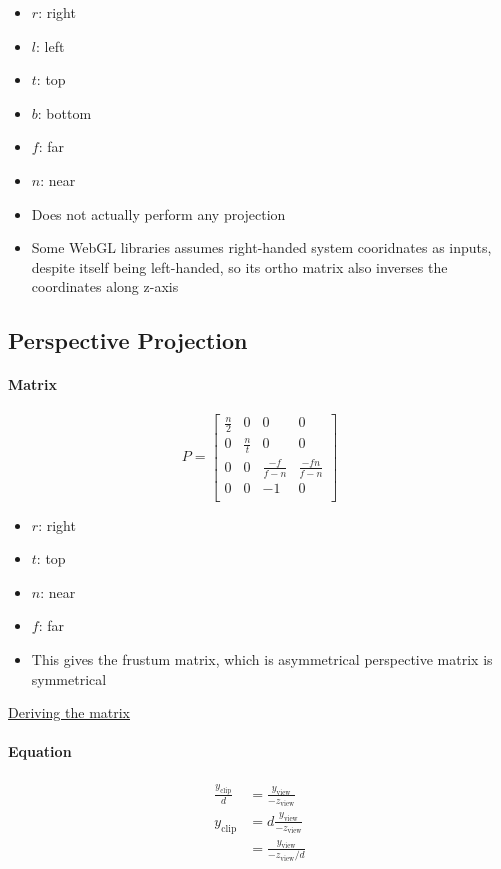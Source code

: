     \begin{itemize}
      \item $ r $: right
      \item $ l $: left
      \item $ t $: top
      \item $ b $: bottom
      \item $ f $: far
      \item $ n $: near
      \item Does not actually perform any projection
      \item Some WebGL libraries assumes right-handed system cooridnates as
      inputs, despite itself being left-handed, so its ortho matrix also
      inverses the coordinates along z-axis
    \end{itemize}

  \subsection{Perspective Projection}

    \paragraph{Matrix}
    \begin{equation}
      P =
      \begin{bmatrix}
        \frac{n}{2} & 0 & 0 & 0 \\
        0 & \frac{n}{t} & 0 & 0 \\
        0 & 0 & \frac{-f}{f - n} & \frac{-fn}{f - n} \\
        0 & 0 & -1 & 0 \\
      \end{bmatrix}
    \end{equation}

    \begin{itemize}
      \item $ r $: right
      \item $ t $: top
      \item $ n $: near
      \item $ f $: far
      \item This gives the frustum matrix, which is asymmetrical
      perspective matrix is symmetrical
    \end{itemize}

    \href{http://www.songho.ca/opengl/gl_projectionmatrix.html}{Deriving
    the matrix}

    \paragraph{Equation}
    \begin{align}
      \frac{y_{\text{clip}}}{d} &= \frac{y_{\text{view}}}{-z_{\text{view}}} \\
      y_{\text{clip}}
      &= d\frac{y_ {\text{view}}}{-z_{\text{view}}} \\
      &= \frac{y_{\text{view}}}{-z_{\text{view}} / d}
    \end{align}

